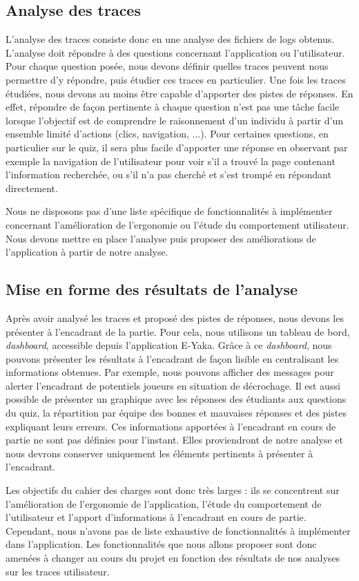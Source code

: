         \subsection{Analyse des traces}
        
            L’analyse des traces consiste donc en une analyse des fichiers de logs obtenus. L’analyse doit répondre à des questions concernant l’application ou l’utilisateur. Pour chaque question posée, nous devons définir quelles traces peuvent nous permettre d’y répondre, puis étudier ces traces en particulier. Une fois les traces étudiées, nous devons au moins être capable d’apporter des pistes de réponses. En effet, répondre de façon pertinente à chaque question n’est pas une tâche facile lorsque l’objectif est de comprendre le raisonnement d’un individu à partir d’un ensemble limité d’actions (clics, navigation, ...). Pour certaines questions, en particulier sur le quiz, il sera plus facile d’apporter une réponse en observant par exemple la navigation de l’utilisateur pour voir s’il a trouvé la page contenant l’information recherchée, ou s’il n’a pas cherché et s'est trompé en répondant directement.
            
            Nous ne disposons pas d'une liste spécifique de fonctionnalités à implémenter concernant l’amélioration de l’ergonomie ou l’étude du comportement utilisateur. Nous devons mettre en place l’analyse puis proposer des améliorations de l’application à partir de notre analyse.

            \subsection{Mise en forme des résultats de l'analyse}

            Après avoir analysé les traces et proposé des pistes de réponses, nous devons les présenter à l'encadrant de la partie. Pour cela, nous utilisons un tableau de bord, \emph{dashboard}, accessible depuis l'application E-Yaka. Grâce à ce \emph{dashboard}, nous pouvons présenter les résultats à l'encadrant de façon lisible en centralisant les informations obtenues. Par exemple, nous pouvons afficher des messages pour alerter l'encadrant de potentiels joueurs en situation de décrochage. Il est aussi possible de présenter un graphique avec les réponses des étudiants aux questions du quiz, la répartition par équipe des bonnes et mauvaises réponses et des pistes expliquant leurs erreurs. Ces informations apportées à l’encadrant en cours de partie ne sont pas définies pour l'instant. Elles proviendront de notre analyse et nous devrons conserver uniquement les éléments pertinents à présenter à l’encadrant.
            
            Les objectifs du cahier des charges sont donc très larges : ils se concentrent sur l’amélioration de l’ergonomie de l’application, l’étude du comportement de l’utilisateur et l’apport d’informations à l’encadrant en cours de partie. Cependant, nous n’avons pas de liste exhaustive de fonctionnalités à implémenter dans l’application. Les fonctionnalités que nous allons proposer sont donc amenées à changer au cours du projet en fonction des résultats de nos analyses sur les traces utilisateur.
            